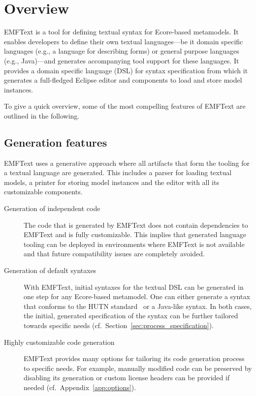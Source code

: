 \chapter{Overview}
EMFText is a tool for defining textual syntax for Ecore-based metamodels. It 
enables developers to define their own textual languages---be it domain
specific languages (e.g., a language for describing forms) or general purpose 
languages (e.g., Java)---and generates accompanying tool support for these 
languages. It provides a domain specific language (DSL) for syntax 
specification from which it generates a full-fledged Eclipse editor and 
components to load and store model instances.

To give a quick overview, some of the most compelling features of EMFText are 
outlined in the following.

\section{Generation features}
EMFText uses a generative approach where all artifacts that form the tooling for
a textual language are generated. This includes a parser for loading textual 
models, a printer for storing model instances and the editor with all its
customizable components.

\begin{description}

  \item[Generation of independent code]
        The code that is generated by EMFText does not contain dependencies
        to EMFText and is fully customizable. This implies that generated 
        language tooling can be deployed in environments where EMFText is not 
        available and that future compatibility issues are completely avoided.

  \item[Generation of default syntaxes]
        With EMFText, initial syntaxes for the textual DSL can be generated 
        in one step for any Ecore-based metamodel. One can either generate a
        syntax that conforms to the HUTN standard~\cite{HUTN} or a Java-like 
        syntax. In both cases, the initial, generated specification of the 
        syntax can be further tailored towards specific needs 
        (cf.~Section~\ref{sec:process_specification}).
        
  \item[Highly customizable code generation]
        EMFText provides many options for tailoring its code generation process
        to specific needs. For example, manually modified code can be preserved
        by disabling its generation or custom license headers can be provided 
        if needed (cf.~Appendix~\ref{app:options}).

\end{description}


